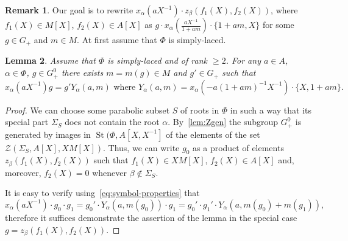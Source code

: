 \documentclass[oneside, 10pt]{amsart}
\newtheorem{lemma}{Lemma}
\theoremstyle{remark}
\theoremstyle{definition}
\newtheorem{rem}[lemma]{Remark}
\DeclareMathOperator{\St}{St}
\numberwithin{equation}{section}
\begin{document}
\begin{rem} Our goal is to rewrite $x_\alpha(aX^{-1}) \cdot z_\beta(f_1(X), f_2(X))$, where $f_1(X) \in M[X]$, $f_2(X) \in A[X]$ as
 $g \cdot x_\alpha(\frac{aX^{-1}}{1+am}) \cdot \{ 1 + am, X \}$ for some $g \in G_+$
 and $m \in M$. At first assume that $\Phi$ is simply-laced. \end{rem}
 
\begin{lemma} \label{lem:lem34} Assume that $\Phi$ is simply-laced and of rank $\geq 2$.
 For any $a\in A$, $\alpha\in \Phi$, $g \in G^0_+$ there exists $m = m(g)\in M$ and $g'\in G_+$ such that 
 \[x_{\alpha}(aX^{-1}) g  = g' Y_\alpha(a,m) \text{ where } Y_\alpha(a,m) = x_\alpha(-a(1+am)^{-1}X^{-1}) \cdot \{X, 1+am\}.\]
\end{lemma}
\begin{proof}
 We can choose some parabolic subset $S$ of roots in $\Phi$ in such a way that its special part $\Sigma_S$ does not contain the root $\alpha$.
 By~\cref{lem:Zgen} the subgroup $G_+^0$ is generated by images in $\St(\Phi, A[X, X^{-1}]$ of the elements of the set $\mathcal{Z}(\Sigma_S, A[X], XM[X])$.
 Thus, we can write $g_0$ as a product of elements $z_\beta(f_1(X), f_2(X))$ such that $f_1(X) \in XM[X]$, $f_2(X) \in A[X]$ and, moreover, $f_2(X) = 0$ whenever $\beta \not \in \Sigma_S$.
 
 It is easy to verify using~\eqref{eq:symbol-properties} that \[x_\alpha(aX^{-1}) \cdot g_0 \cdot g_1 = g_0' \cdot Y_\alpha(a, m(g_0)) \cdot g_1 = g_0' \cdot g_1' \cdot Y_\alpha(a, m(g_0)+m(g_1)),\] therefore it suffices demonstrate the assertion of the lemma in the special case $g = z_\beta(f_1(X), f_2(X))$.
 

\end{proof}
\end{document}
